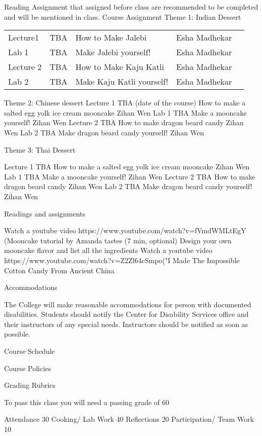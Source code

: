 \documentclass{article}
\begin{document}
Reading Assignment that assigned before class are recommended to be completed and will be mentioned in class.
Course Assignment
Theme 1: Indian Dessert

\begin{table}[]
\begin{tabular}{lllll}
 Lecture1 &  TBA & How to Make Jalebi & Esha Madhekar  \\
 Lab 1 &  TBA & Make Jalebi yourself! & Esha Madhekar  \\
 Lecture 2 &  TBA & How to Make Kaju Katli & Esha Madhekar  \\
 Lab 2 & TBA & Make Kaju Katli yourself! & Esha Madhekar 
\end{tabular}
\end{table}

Theme 2: Chinese dessert
Lecture 1
TBA
(date of the course)
How to make a salted egg yolk ice cream mooncake 
Zihan Wen
Lab 1 
TBA
Make a mooncake yourself!
Zihan Wen
Lecture 2
TBA
How to make dragon beard candy
Zihan Wen
Lab 2 
TBA
Make dragon beard candy yourself!
Zihan Wen

Theme 3: Thai Dessert

Lecture 1
TBA
How to make a salted egg yolk ice cream mooncake 
Zihan Wen
Lab 1 
TBA
Make a mooncake yourself!
Zihan Wen
Lecture 2 
TBA
How to make dragon beard candy
Zihan Wen
Lab 2 
TBA
Make dragon beard candy yourself!
Zihan Wen

Readings and assignments

Watch a youtube video https://www.youtube.com/watch?v=fVmdWMLtEgY (Mooncake tutorial by Amanda tastes (7 min, optional)
Design your own mooncake flavor and list all the ingredients 
Watch a youtube video https://www.youtube.com/watch?v=Z2Zl64cSmpo("I Made The Impossible Cotton Candy From Ancient China 

Accommodations 

The College will make reasonable accommodations for person with documented disabilities. Students should notify the Center for Disability Services office and their instructors of any special needs. Instructors should be notified as soon as possible.

Course Schedule

Course Policies

Grading Rubrics 

To pass this class you will need a passing grade of 60%
   
Attendance
30%
Cooking/ Lab Work
40%
Reflections
20%
Participation/ Team Work
10%
 
\end{document}
